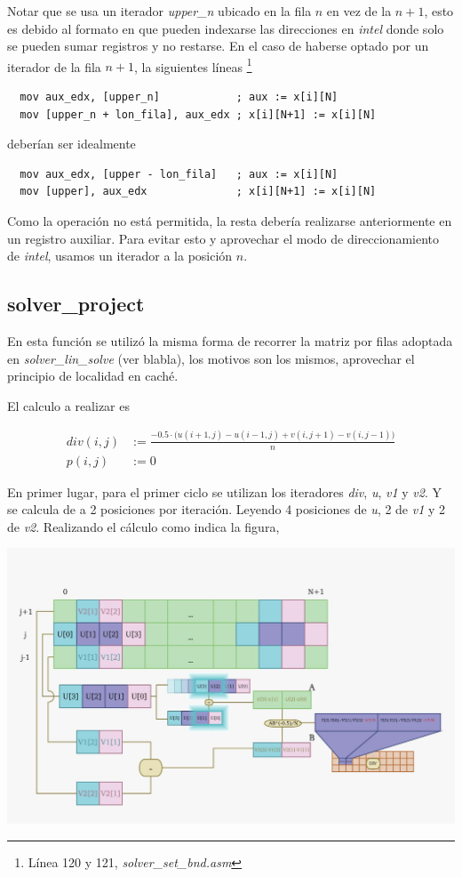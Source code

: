 Notar que se usa un iterador {\it upper_n\/} ubicado en la fila $n$ en vez
de la $n+1$, esto es debido al formato en que pueden indexarse las direcciones
en {\it intel\/} donde solo se pueden sumar registros y no restarse. En el caso
de haberse optado por un iterador de la fila $n+1$, la siguientes líneas
\footnote{Línea 120 y 121, {\it solver_set_bnd.asm\/}}

\lstset{numbers=none}
\begin{lstlisting}
  mov aux_edx, [upper_n]            ; aux := x[i][N]
  mov [upper_n + lon_fila], aux_edx ; x[i][N+1] := x[i][N]
\end{lstlisting}
deberían ser idealmente
\begin{lstlisting}
  mov aux_edx, [upper - lon_fila]   ; aux := x[i][N]
  mov [upper], aux_edx              ; x[i][N+1] := x[i][N]
\end{lstlisting}

Como la operación no está permitida, la resta debería realizarse anteriormente
en un registro auxiliar. Para evitar esto y aprovechar el modo de
direccionamiento de {\it intel\/}, usamos un iterador a la posición $n$.


\subsection{solver_project}

En esta función se utilizó la misma forma de recorrer la matriz por filas
adoptada en {\it solver_lin_solve\/} (ver blabla), los motivos son los mismos,
aprovechar el principio de localidad en caché.

El calculo a realizar es

{
\setlength{\abovedisplayskip}{-5pt}
\setlength{\belowdisplayskip}{-10pt}
\begin{align*}
  div(i,j) &:= \frac{-0.5 \cdot \bigl(u(i+1,j)-u(i-1,j)+v(i,j+1)-v(i,j-1)\bigr)}{n}\\
  p(i,j)   &:= 0
\end{align*}
}

En primer lugar, para el primer ciclo se utilizan los iteradores {\it div\/},
{\it u\/}, {\it v1\/} y {\it v2\/}.
Y se calcula de a 2 posiciones por iteración. Leyendo 4 posiciones de {\it u\/},
2 de {\it v1\/} y 2 de {\it v2\/}. Realizando el cálculo como indica la figura,

\includegraphics[width=\textwidth]{imagenes/div.jpeg}

